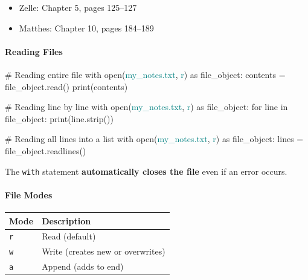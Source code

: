 \documentclass[
  justified,
  openright,
]{tufte-book}
\let\subsubsection\paragraph
\let\paragraph\paragraph
\newcommand{\BuiltInTok}[1]{#1}
\newcommand{\CommentTok}[1]{\textcolor{MidGray}{#1}}
\newcommand{\ControlFlowTok}[1]{\textcolor{BrandBlue}{#1}}
\newcommand{\ImportTok}[1]{\textcolor{BrandAccent}{#1}}
\newcommand{\KeywordTok}[1]{\textcolor{BrandBlue}{#1}}
\newcommand{\NormalTok}[1]{#1}
\newcommand{\OperatorTok}[1]{\textcolor{DarkGray}{#1}}
\newcommand{\StringTok}[1]{\textcolor{Teal}{#1}}
\newenvironment{Shaded}{%
  \begin{snugshade}
}{%
  \end{snugshade}
}
\let\subsubsection\paragraph
\let\paragraph\paragraph
\providecommand{\tightlist}{%
  \setlength{\itemsep}{0pt}\setlength{\parskip}{0pt}}
\begin{document}
\begin{itemize}
\tightlist
\item
  Zelle: Chapter 5, pages 125--127
\item
  Matthes: Chapter 10, pages 184--189
\end{itemize}

\subsubsection{Reading Files}\label{reading-files}

\begin{Shaded}
\begin{Highlighting}[]
\CommentTok{\# Reading entire file}
\ControlFlowTok{with} \BuiltInTok{open}\NormalTok{(}\StringTok{\textquotesingle{}my\_notes.txt\textquotesingle{}}\NormalTok{, }\StringTok{\textquotesingle{}r\textquotesingle{}}\NormalTok{) }\ImportTok{as}\NormalTok{ file\_object:}
\NormalTok{    contents }\OperatorTok{=}\NormalTok{ file\_object.read()}
\BuiltInTok{print}\NormalTok{(contents)}

\CommentTok{\# Reading line by line}
\ControlFlowTok{with} \BuiltInTok{open}\NormalTok{(}\StringTok{\textquotesingle{}my\_notes.txt\textquotesingle{}}\NormalTok{, }\StringTok{\textquotesingle{}r\textquotesingle{}}\NormalTok{) }\ImportTok{as}\NormalTok{ file\_object:}
    \ControlFlowTok{for}\NormalTok{ line }\KeywordTok{in}\NormalTok{ file\_object:}
        \BuiltInTok{print}\NormalTok{(line.strip())}

\CommentTok{\# Reading all lines into a list}
\ControlFlowTok{with} \BuiltInTok{open}\NormalTok{(}\StringTok{\textquotesingle{}my\_notes.txt\textquotesingle{}}\NormalTok{, }\StringTok{\textquotesingle{}r\textquotesingle{}}\NormalTok{) }\ImportTok{as}\NormalTok{ file\_object:}
\NormalTok{    lines }\OperatorTok{=}\NormalTok{ file\_object.readlines()}
\end{Highlighting}
\end{Shaded}

The \texttt{with} statement \textbf{automatically closes the file} even
if an error occurs.

\subsubsection{File Modes}\label{file-modes}

{\def\LTcaptype{none} %
\begin{longtable}[]{@{}ll@{}}
\toprule\noalign{}
Mode & Description \\
\midrule\noalign{}
\endhead
\bottomrule\noalign{}
\endlastfoot
\texttt{\textquotesingle{}r\textquotesingle{}} & Read (default) \\
\texttt{\textquotesingle{}w\textquotesingle{}} & Write (creates new or
overwrites) \\
\texttt{\textquotesingle{}a\textquotesingle{}} & Append (adds to end) \\
\end{longtable}
}
\end{document}
